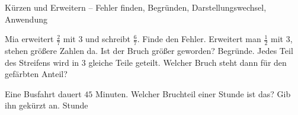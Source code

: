\begin{aufgabe}{Kürzen und Erweitern – Fehler finden, Begründen, Darstellungswechsel, Anwendung}
\begin{teile}
\teil Mia erweitert $\frac{2}{7}$ mit $3$ und schreibt $\frac{6}{7}$. Finde den Fehler.
\teil Erweitert man $\frac{1}{2}$ mit $3$, stehen größere Zahlen da. Ist der Bruch größer geworden? Begründe.
\teil Jedes Teil des Streifens wird in $3$ gleiche Teile geteilt. Welcher Bruch steht dann für den gefärbten Anteil?

\leerfeld
\teil Eine Busfahrt dauert $45$ Minuten. Welcher Bruchteil einer Stunde ist das? Gib ihn gekürzt an. \leerfeld Stunde
\end{teile}
\end{aufgabe}
